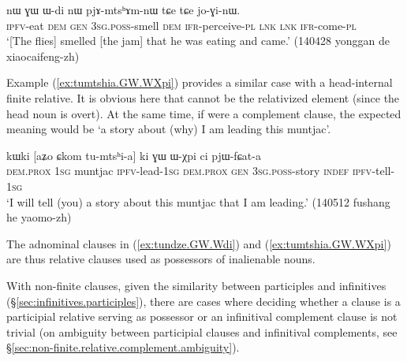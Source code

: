 \begin{exe}
\ex  \label{ex:tundze.GW.Wdi}
\gll [tu-ndze] nɯ ɣɯ ɯ-di nɯ pjɤ-mtsʰɤm-nɯ tɕe tɕe jo-ɣi-nɯ. \\
\textsc{ipfv}-eat \textsc{dem} \textsc{gen} \textsc{3sg}.\textsc{poss}-smell \textsc{dem} \textsc{ifr}-perceive-\textsc{pl} \textsc{lnk} \textsc{lnk} \textsc{ifr}-come-\textsc{pl} \\
\glt `[The flies] smelled [the jam] that he was eating and came.' (140428 yonggan de xiaocaifeng-zh)
\end{exe}

Example (\ref{ex:tumtshia.GW.WXpi}) provides a similar case with a head-internal finite relative. It is obvious here that  cannot be the relativized element (since the head noun  is overt). At the same time, if  were a complement clause, the expected meaning would be `a story about (why) I am leading this muntjac'. 

\begin{exe}
\ex  \label{ex:tumtshia.GW.WXpi}
\gll kɯki [aʑo ɕkom tu-mtsʰi-a] ki ɣɯ ɯ-χpi ci pjɯ-fɕat-a \\
\textsc{dem}.\textsc{prox} \textsc{1sg} muntjac \textsc{ipfv}-lead-\textsc{1sg} \textsc{dem}.\textsc{prox} \textsc{gen} \textsc{3sg}.\textsc{poss}-story \textsc{indef} \textsc{ipfv}-tell-\textsc{1sg} \\
\glt `I will tell (you) a story about this muntjac that I am leading.' (140512 fushang he yaomo-zh)
\end{exe}

The adnominal clauses in (\ref{ex:tundze.GW.Wdi}) and (\ref{ex:tumtshia.GW.WXpi}) are thus relative clauses used as possessors of inalienable nouns.

With non-finite clauses, given the similarity between participles and infinitives (§\ref{sec:infinitives.participles}), there are cases where deciding whether a clause is a participial relative serving as possessor or an infinitival complement clause is not trivial (on ambiguity between participial clauses and infinitival complements, see §\ref{sec:non-finite.relative.complement.ambiguity}). 

